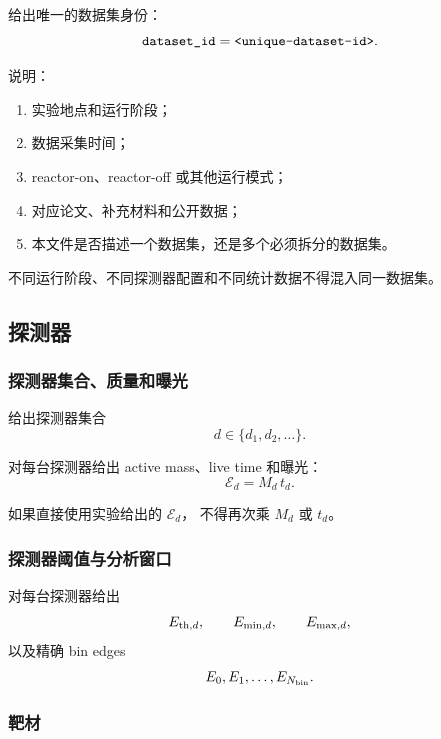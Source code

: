 给出唯一的数据集身份：
\begin{equation}
  \texttt{dataset\_id}
  =
  \texttt{<unique-dataset-id>}.
\end{equation}

说明：
\begin{enumerate}
  \item 实验地点和运行阶段；
  \item 数据采集时间；
  \item reactor-on、reactor-off 或其他运行模式；
  \item 对应论文、补充材料和公开数据；
  \item 本文件是否描述一个数据集，还是多个必须拆分的数据集。
\end{enumerate}

不同运行阶段、不同探测器配置和不同统计数据不得混入同一数据集。

\subsection{探测器}

\subsubsection{探测器集合、质量和曝光}

给出探测器集合
\begin{equation}
  d\in\{d_1,d_2,\ldots\}.
\end{equation}

对每台探测器给出 active mass、live time 和曝光：
\begin{equation}
  \mathcal E_d
  =
  M_d\,t_d.
\end{equation}

如果直接使用实验给出的 $\mathcal E_d$，
不得再次乘 $M_d$ 或 $t_d$。

\subsubsection{探测器阈值与分析窗口}

对每台探测器给出
\begin{equation}
  E_{{\rm th},d},
  \qquad
  E_{{\rm min},d},
  \qquad
  E_{{\rm max},d},
\end{equation}
以及精确 bin edges
\begin{equation}
  E_0,E_1,\ldots,E_{N_{\rm bin}}.
\end{equation}

\subsubsection{靶材}

